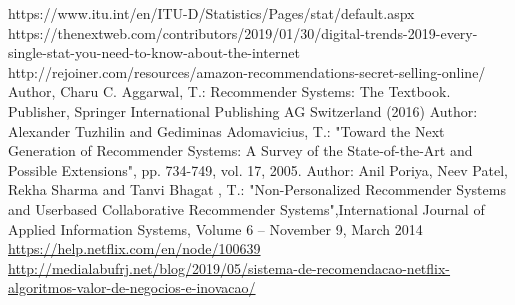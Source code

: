 \documentclass[runningheads]{llncs}
\begin{document}


\newpage
\hfill









\newpage

%
%
%
% 
% 
%
\begin{thebibliography}{8}

https://www.itu.int/en/ITU-D/Statistics/Pages/stat/default.aspx
https://thenextweb.com/contributors/2019/01/30/digital-trends-2019-every-single-stat-you-need-to-know-about-the-internet
http://rejoiner.com/resources/amazon-recommendations-secret-selling-online/
Author, Charu C. Aggarwal, T.: Recommender Systems: The Textbook. Publisher, Springer International Publishing AG Switzerland (2016)
Author: Alexander Tuzhilin and Gediminas Adomavicius, T.: "Toward the Next Generation of Recommender Systems: A Survey of the State-of-the-Art and Possible Extensions", pp. 734-749, vol. 17, 2005.
Author: Anil Poriya, Neev Patel, Rekha Sharma and Tanvi Bhagat , T.: "Non-Personalized Recommender Systems and Userbased Collaborative Recommender Systems",International Journal of Applied Information Systems, Volume 6 – November 9, March 2014
 \url{https://help.netflix.com/en/node/100639}
 \url{http://medialabufrj.net/blog/2019/05/sistema-de-recomendacao-netflix-algoritmos-valor-de-negocios-e-inovacao/}


\end{thebibliography}
\end{document}
